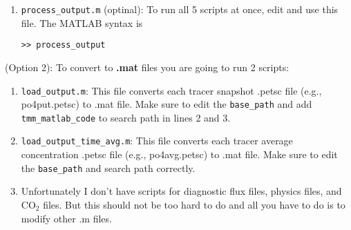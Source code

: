 \documentclass[a4paper]{article}
\def\noin{\noindent }
\begin{document}
\begin{enumerate}
\item\verb|process_output.m| (optinal): To run all 5 scripts at once, edit and use this file. The MATLAB syntax is 
\begin{lstlisting}[style=DOS]
 >> process_output
\end{lstlisting}

\end{enumerate}

\noin (Option 2): To convert to \textbf{.mat} files you are going to run 2 scripts:
\begin{enumerate}

\item \verb|load_output.m|: This file converts each tracer snapshot .petsc file (e.g., po4put.petsc) to .mat file. Make sure to edit the \verb|base_path| and add \verb|tmm_matlab_code| to search path in lines 2 and 3.
\item \verb|load_output_time_avg.m|: This file converts each tracer average concentration .petsc file (e.g., po4avg.petsc) to .mat file. Make sure to edit the \verb|base_path| and search path correctly.
\item Unfortunately I don't have scripts for diagnostic flux files, physics files, and $\mathrm{CO_{2}}$ files. But this should not be too hard to do and all you have to do is to modify other .m files.

\end{enumerate}
\end{document}
